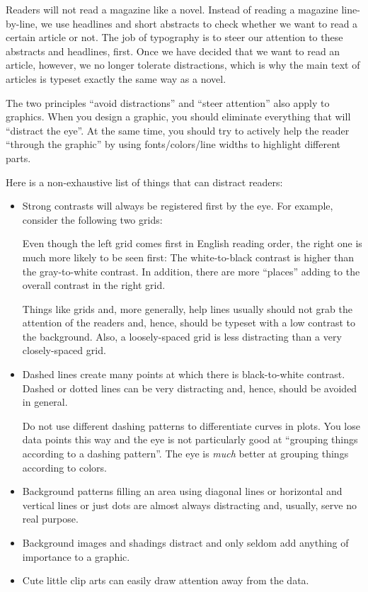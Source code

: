Readers will not read a magazine like a novel. Instead of reading a magazine
line-by-line, we use headlines and short abstracts to check whether we want to
read a certain article or not. The job of typography is to steer our attention
to these abstracts and headlines, first. Once we have decided that we want to
read an article, however, we no longer tolerate distractions, which is why the
main text of articles is typeset exactly the same way as a novel.

The two principles ``avoid distractions'' and ``steer attention'' also apply to
graphics. When you design a graphic, you should eliminate everything that will
``distract the eye''. At the same time, you should try to actively help the
reader ``through the graphic'' by using fonts/colors/line widths to highlight
different parts.

Here is a non-exhaustive list of things that can distract readers:
%
\begin{itemize}
    \item Strong contrasts will always be registered first by the eye. For
        example, consider the following two grids:

        \medskip\par

        \medskip
        Even though the left grid comes first in English reading order, the
        right one is much more likely to be seen first: The white-to-black
        contrast is higher than the gray-to-white contrast. In addition,
        there are more ``places'' adding to the overall contrast in the right
        grid.

        Things like grids and, more generally, help lines usually should not
        grab the attention of the readers and, hence, should be typeset with
        a low contrast to the background. Also, a loosely-spaced grid is less
        distracting than a very closely-spaced grid.
    \item Dashed lines create many points at which there is black-to-white
        contrast. Dashed or dotted lines can be very distracting and, hence,
        should be avoided in general.

        Do not use different dashing patterns to differentiate curves in
        plots. You lose data points this way and the eye is not particularly
        good at ``grouping things according to a dashing pattern''. The eye
        is \emph{much} better at grouping things according to colors.
    \item Background patterns filling an area using  diagonal lines or
        horizontal and vertical lines or just dots are almost always
        distracting and, usually, serve no real purpose.
    \item Background images and shadings distract and only seldom add
        anything of importance to a graphic.
    \item Cute little clip arts can easily draw attention away from the data.
\end{itemize}
